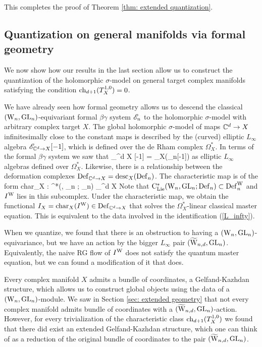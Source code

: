 This completes the proof of Theorem \ref{thm: extended quantization}.

\subsection{Quantization on general manifolds via formal geometry}

We now show how our results in the last section allow us to construct the quantization of the holomorphic $\sigma$-model on general target complex manifolds satisfying the condition ${\rm ch}_{d+1}(T_X^{1,0}) = 0$.

We have already seen how formal geometry allows us to descend the classical $({{\rm W}_n},{\rm GL}_n)$-equivariant formal $\beta\gamma$ system $\mathscr E_n$ to the holomorphic $\sigma$-model with arbitrary complex target $X$.
The global holomorphic $\sigma$-model of maps $\mathbb C^d \to X$ infinitesimally close to the constant maps is described by the (curved) elliptic $L_\infty$ algebra $\mathscr E_{\mathbb C^d \to X} [-1]$, which is defined over the de Rham complex $\Omega^*_X$. 
In terms of the formal $\beta\gamma$ system we saw that 
\be\label{L_infty}
\sE_{\CC^d \to X} [-1] = \ddesc_X(\sE_n[-1])
\ee
as elliptic $L_\infty$ algebras defined over $\Omega^*_X$.
Likewise, there is a relationship between the deformation complexes ${\rm Def}_{\mathbb C^d \to X} = {\rm desc}_X({\rm Def}_n)$. 
The characteristic map is of the form
\ben
{\rm char}_X : \clie^*(\Vect, \GL_n ; \Def_n) \to \Def_{\CC^d \to X}
\een
Note that ${\rm C}_{{\rm Lie}}^*({{\rm W}_n}, {\rm GL}_n ; {\rm Def}_n) \subset {\rm Def}_n^{\rm W}$ and $I^{\rm W}$ lies in this subcomplex. 
Under the characteristic map, we obtain the functional $I_X = {\rm char}_X(I^{\rm W}) \in {\rm Def}_{\mathbb C^d \to X}$ that solves the $\Omega^*_X$-linear classical master equation.
This is equivalent to the data involved in the identification (\ref{L_infty}).
 
When we quantize, we found that there is an obstruction to having a $({{\rm W}_n},{\rm GL}_n)$-equivariance, but we have an action by the bigger $L_\infty$ pair $(\widetilde{\rm W}_{n,d}, {\rm GL}_n)$. 
Equivalently, the naive RG flow of $I^{\rm W}$ does not satisfy the quantum master equation, but we can found a modification of it that does. 

Every complex manifold $X$ admits a bundle of coordinates, a Gelfand-Kazhdan structure, which allows us to construct global objects using the data of a $({{\rm W}_n},{\rm GL}_n)$-module.
We saw in Section \ref{sec: extended geometry} that not every complex manifold admits bundle of coordinates with a $(\widetilde{\rm W}_{n,d}, {\rm GL}_n)$-action.
However, for every trivialization of the characteristic class ${\rm ch}_{d+1}(T_X^{1,0})$ we found that there did exist an extended Gelfand-Kazhdan structure, which one can think of as a reduction of the original bundle of coordinates to the pair $(\widetilde{\rm W}_{n,d}, {\rm GL}_n)$. 

